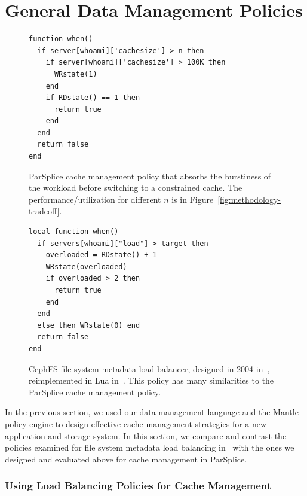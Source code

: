 \section{General Data Management Policies}
\label{sec:scope}

\begin{figure}[tb]
  \centering
  \ssp
  \begin{verbatim}
function when()
  if server[whoami]['cachesize'] > n then
    if server[whoami]['cachesize'] > 100K then
      WRstate(1)
    end
    if RDstate() == 1 then
      return true
    end
  end
  return false
end
  \end{verbatim}
  \caption{ParSplice cache management policy that absorbs the burstiness of the
  workload before switching to a constrained cache.  The performance/utilization
  for different  \(n\) is in Figure~\ref{fig:methodology-tradeoff}.}
  \label{src:lru-dyn}
\end{figure}

\begin{figure}
  \centering
  \ssp
  \begin{verbatim}
local function when()
  if servers[whoami]["load"] > target then
    overloaded = RDstate() + 1
    WRstate(overloaded)
    if overloaded > 2 then
      return true
    end
  end
  else then WRstate(0) end
  return false
end
  \end{verbatim}
  \caption{CephFS file system metadata load balancer, designed in 2004
  in~\cite{weil:sc2004-dyn-metadata}, reimplemented in Lua
  in~\cite{sevilla:sc15-mantle}. This policy has many similarities to the
  ParSplice cache management policy.\label{src:lua-cephfs}}
\end{figure}

In the previous section, we used our data management language and the Mantle
policy engine to design effective cache management strategies for a new
application and storage system. In this section, we compare and contrast the
policies examined for file system metadata load balancing
in~\cite{sevilla:sc15-mantle} with the ones we designed and evaluated above for
cache management in ParSplice. 

\subsubsection{Using Load Balancing Policies for Cache Management}

